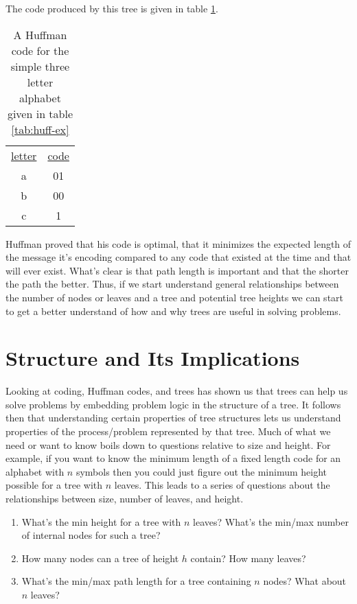 \documentclass[]{tufte-handout}
\begin{document}
The code produced by this tree is given in table \ref{tab:huffcodes}.
\begin{table}
\begin{tabular}{cc}
\underline{letter} & \underline{code} \\ 
a &  01 \\
b &  00 \\
c &  1
\end{tabular}
\label{tab:huffcodes}
\caption{A Huffman code for the simple three letter alphabet given in table \ref{tab:huff-ex}}
\end{table}

Huffman proved that his code is optimal, that it minimizes the expected length of the message it's encoding compared to any code that existed at the time and that will ever exist. What's clear is that path length is important and that the shorter the path the better. Thus, if we start understand general relationships between the number of nodes or leaves and a tree and potential tree heights we can start to get a better understand of how and why trees are useful in solving problems. 

\section{Structure and Its Implications}

Looking at coding, Huffman codes, and trees has shown us that trees can help us solve problems by embedding problem logic in the structure of a tree.  It follows then that understanding certain properties of tree structures lets us understand properties of the process/problem represented by that tree. Much of what we need or want to know boils down to questions relative to size and height. For example, if you want to know the minimum length of a fixed length code for an alphabet with $n$ symbols then you could just figure out the minimum height possible for a tree with $n$ leaves. This leads to a series of questions about the relationships between size, number of leaves, and height.
\begin{enumerate}
\item What's the min height for a tree with $n$ leaves? What's the min/max number of internal nodes for such a tree?
\item How many nodes can a tree of height $h$ contain? How many leaves?
\item What's the min/max path length for a tree containing $n$ nodes? What about $n$ leaves? 
\end{enumerate}
\end{document}
